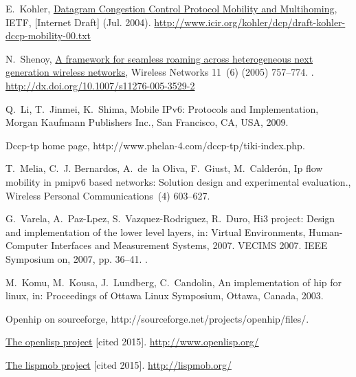 \documentclass[preprint,12pt]{elsarticle}
\begin{document}
\begin{thebibliography}{10}
E.~Kohler,
  \href{http://www.icir.org/kohler/dcp/draft-kohler-dccp-mobility-00.txt}{Datagram
  Congestion Control Protocol Mobility and Multihoming}, IETF, [Internet Draft]
  (Jul. 2004).
\newline\urlprefix\url{http://www.icir.org/kohler/dcp/draft-kohler-dccp-mobility-00.txt}

N.~Shenoy, \href{http://dx.doi.org/10.1007/s11276-005-3529-2}{A framework for
  seamless roaming across heterogeneous next generation wireless networks},
  Wireless Networks 11~(6) (2005) 757--774.
\newblock \href {http://dx.doi.org/10.1007/s11276-005-3529-2}
  {}.
\newline\urlprefix\url{http://dx.doi.org/10.1007/s11276-005-3529-2}

Q.~Li, T.~Jinmei, K.~Shima, Mobile IPv6: Protocols and Implementation, Morgan
  Kaufmann Publishers Inc., San Francisco, CA, USA, 2009.

Dccp-tp home page, http://www.phelan-4.com/dccp-tp/tiki-index.php.

T.~Melia, C.~J. Bernardos, A.~de~la Oliva, F.~Giust, M.~Calderón, Ip flow
  mobility in pmipv6 based networks: Solution design and experimental
  evaluation., Wireless Personal Communications~(4)  603--627.

G.~Varela, A.~Paz-Lpez, S.~Vazquez-Rodriguez, R.~Duro, Hi3 project: Design and
  implementation of the lower level layers, in: Virtual Environments,
  Human-Computer Interfaces and Measurement Systems, 2007. VECIMS 2007. IEEE
  Symposium on, 2007, pp. 36--41.
\newblock \href {http://dx.doi.org/10.1109/VECIMS.2007.4373924}
  {}.

M.~Komu, M.~Kousa, J.~Lundberg, C.~Candolin, An implementation of hip for
  linux, in: Proceedings of Ottawa Linux Symposium, Ottawa, Canada, 2003.

Openhip on sourceforge, http://sourceforge.net/projects/openhip/files/.

\href{http://www.openlisp.org/}{The openlisp project} [cited 2015].
\newline\urlprefix\url{http://www.openlisp.org/}

\href{http://lispmob.org/}{The lispmob project} [cited 2015].
\newline\urlprefix\url{http://lispmob.org/}


\end{thebibliography}
\end{document}
